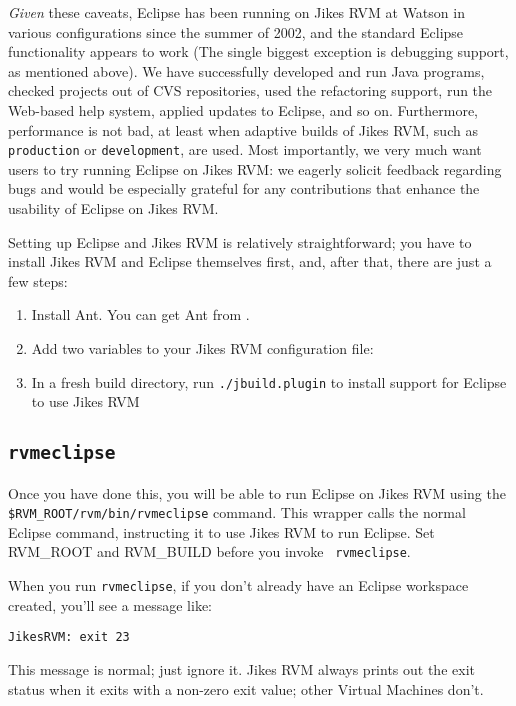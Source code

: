 {\it Given} these caveats, Eclipse has been running on Jikes RVM at
Watson in various configurations since the summer of 2002, and the
standard Eclipse functionality appears to work (The single biggest
exception is debugging support, as mentioned above).  We have
successfully developed and run Java programs, checked projects out of
CVS repositories, used the refactoring support, run the Web-based help
system, applied updates to Eclipse, and so on.  Furthermore,
performance is not bad, at least when adaptive builds of Jikes RVM,
such as {\tt production} or {\tt development}, are used.  Most
importantly, we very much want users to try running Eclipse on Jikes
RVM: we eagerly solicit feedback regarding bugs and would be
especially grateful for any contributions that enhance the usability
of Eclipse on Jikes RVM.

Setting up Eclipse and Jikes RVM is relatively straightforward; you
have to install Jikes RVM and Eclipse themselves first, and, after
that, there are just a few steps:
\begin{enumerate}
\item Install Ant.  You can get Ant from
\xlink{{\tt \antURL}}{\antURL}. 
\item Add two variables to your Jikes RVM configuration file:
\item In a fresh build directory, run {\tt ./jbuild.plugin} to install
support for Eclipse to use Jikes RVM
\end{enumerate}

\subsection{{\tt rvmeclipse}}

Once you have done this, you will be able to run Eclipse on Jikes RVM
using the {\tt \$RVM\_ROOT/rvm/bin/rvmeclipse} command.  This wrapper
calls the normal Eclipse command, instructing it to use Jikes RVM to
run Eclipse.  Set RVM\_ROOT and RVM\_BUILD before you invoke {\tt
rvmeclipse}.

When you run {\tt rvmeclipse}, if you don't already
have an Eclipse workspace created, you'll see a message like:
\begin{example}
{\tt JikesRVM: exit 23}
\end{example}
This message is normal; just ignore it.  Jikes RVM always prints out
the exit status when it exits with a non-zero exit value; other \JavaTM{}
Virtual Machines don't.

